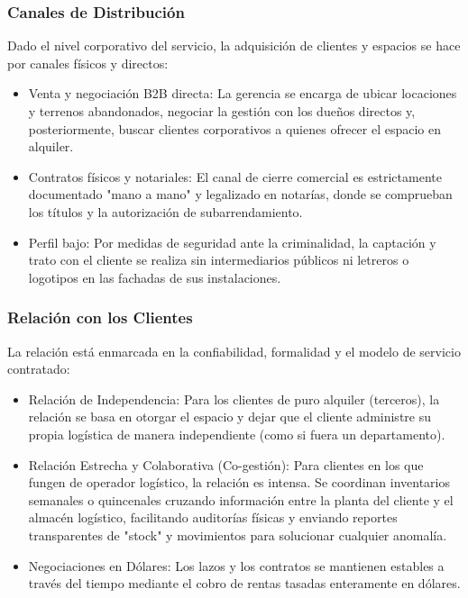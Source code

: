 \documentclass[11pt]{article}
\begin{document}
\subsubsection{Canales de Distribución} Dado el nivel corporativo del
servicio, la adquisición de clientes y espacios se hace por canales
físicos y directos:

\begin{itemize}
\item
  Venta y negociación B2B directa: La gerencia se encarga de ubicar
  locaciones y terrenos abandonados, negociar la gestión con los dueños
  directos y, posteriormente, buscar clientes corporativos a quienes
  ofrecer el espacio en alquiler.
\item
  Contratos físicos y notariales: El canal de cierre comercial es
  estrictamente documentado "mano a mano" y legalizado en notarías,
  donde se comprueban los títulos y la autorización de subarrendamiento.
\item
  Perfil bajo: Por medidas de seguridad ante la criminalidad, la
  captación y trato con el cliente se realiza sin intermediarios
  públicos ni letreros o logotipos en las fachadas de sus instalaciones.
\end{itemize}

\subsubsection{Relación con los Clientes} La relación está enmarcada en
la confiabilidad, formalidad y el modelo de servicio contratado:

\begin{itemize}
\item
  Relación de Independencia: Para los clientes de puro alquiler
  (terceros), la relación se basa en otorgar el espacio y dejar que el
  cliente administre su propia logística de manera independiente (como
  si fuera un departamento).
\item
  Relación Estrecha y Colaborativa (Co-gestión): Para clientes en los
  que fungen de operador logístico, la relación es intensa. Se coordinan
  inventarios semanales o quincenales cruzando información entre la
  planta del cliente y el almacén logístico, facilitando auditorías
  físicas y enviando reportes transparentes de "stock" y movimientos
  para solucionar cualquier anomalía.
\item
  Negociaciones en Dólares: Los lazos y los contratos se mantienen
  estables a través del tiempo mediante el cobro de rentas tasadas
  enteramente en dólares.
\end{itemize}
\end{document}
